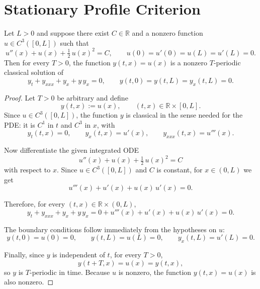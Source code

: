 \section{Stationary Profile Criterion}

\begin{lemma}\label{lem:stationary}
Let $L > 0$ and suppose there exist $C \in \mathbb{R}$ and a nonzero function $u \in C^3([0,L])$ such that
\[
u''(x) + u(x) + \tfrac{1}{2}\,u(x)^2 = C, \qquad u(0) = u'(0) = u(L) = u'(L) = 0.
\]
Then for every $T > 0$, the function $y(t,x) = u(x)$ is a nonzero $T$-periodic classical solution of
\[
y_t + y_{xxx} + y_x + y\,y_x = 0, \qquad y(t,0) = y(t,L) = y_x(t,L) = 0.
\]
\end{lemma}

\begin{proof}
Let $T > 0$ be arbitrary and define
\[
y(t,x) := u(x), \qquad (t,x) \in \mathbb{R} \times [0,L].
\]
Since $u \in C^3([0,L])$, the function $y$ is classical in the sense needed for the PDE: it is $C^1$ in $t$ and $C^3$ in $x$, with
\[
y_t(t,x) = 0, \qquad y_x(t,x) = u'(x), \qquad y_{xxx}(t,x) = u'''(x).
\]

Now differentiate the given integrated ODE
\[
u''(x) + u(x) + \tfrac{1}{2}\,u(x)^2 = C
\]
with respect to $x$. Since $u \in C^3([0,L])$ and $C$ is constant, for $x \in (0,L)$ we get
\[
u'''(x) + u'(x) + u(x)\,u'(x) = 0.
\]

Therefore, for every $(t,x) \in \mathbb{R} \times (0,L)$,
\[
y_t + y_{xxx} + y_x + y\,y_x = 0 + u'''(x) + u'(x) + u(x)\,u'(x) = 0.
\]

The boundary conditions follow immediately from the hypotheses on $u$:
\[
y(t,0) = u(0) = 0, \qquad y(t,L) = u(L) = 0, \qquad y_x(t,L) = u'(L) = 0.
\]

Finally, since $y$ is independent of $t$, for every $T > 0$,
\[
y(t+T, x) = u(x) = y(t,x),
\]
so $y$ is $T$-periodic in time. Because $u$ is nonzero, the function $y(t,x) = u(x)$ is also nonzero.
\end{proof}

